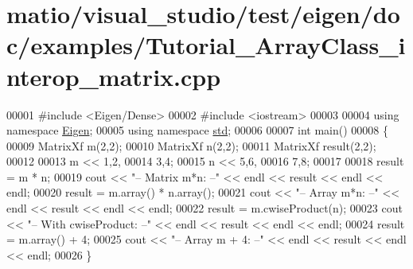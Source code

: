 \hypertarget{matio_2visual__studio_2test_2eigen_2doc_2examples_2_tutorial___array_class__interop__matrix_8cpp_source}{}\section{matio/visual\+\_\+studio/test/eigen/doc/examples/\+Tutorial\+\_\+\+Array\+Class\+\_\+interop\+\_\+matrix.cpp}
\label{matio_2visual__studio_2test_2eigen_2doc_2examples_2_tutorial___array_class__interop__matrix_8cpp_source}

\begin{DoxyCode}
00001 \textcolor{preprocessor}{#include <Eigen/Dense>}
00002 \textcolor{preprocessor}{#include <iostream>}
00003 
00004 \textcolor{keyword}{using namespace }\hyperlink{namespace_eigen}{Eigen};
00005 \textcolor{keyword}{using namespace }\hyperlink{namespacestd}{std};
00006 
00007 \textcolor{keywordtype}{int} main()
00008 \{
00009   MatrixXf m(2,2);
00010   MatrixXf n(2,2);
00011   MatrixXf result(2,2);
00012 
00013   m << 1,2,
00014        3,4;
00015   n << 5,6,
00016        7,8;
00017 
00018   result = m * n;
00019   cout << \textcolor{stringliteral}{"-- Matrix m*n: --"} << endl << result << endl << endl;
00020   result = m.array() * n.array();
00021   cout << \textcolor{stringliteral}{"-- Array m*n: --"} << endl << result << endl << endl;
00022   result = m.cwiseProduct(n);
00023   cout << \textcolor{stringliteral}{"-- With cwiseProduct: --"} << endl << result << endl << endl;
00024   result = m.array() + 4;
00025   cout << \textcolor{stringliteral}{"-- Array m + 4: --"} << endl << result << endl << endl;
00026 \}
\end{DoxyCode}
